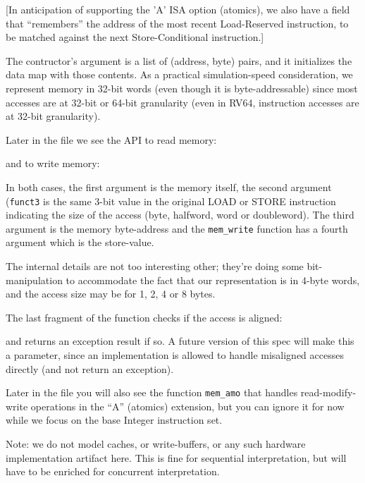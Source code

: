 \documentclass[11pt]{article}
\begin{document}
[In anticipation of supporting the 'A' ISA option (atomics), we also
have a field that ``remembers'' the address of the most recent
Load-Reserved instruction, to be matched against the next
Store-Conditional instruction.]

The contructor's argument is a list of (address, byte) pairs, and it
initializes the data map with those contents.  As a practical
simulation-speed consideration, we represent memory in 32-bit words
(even though it is byte-addressable) since most accesses are at 32-bit
or 64-bit granularity (even in RV64, instruction accesses are at
32-bit granularity).

Later in the file we see the API to read memory:



and to write memory:



In both cases, the first argument is the memory itself, the second
argument (\verb|funct3| is the same 3-bit value in the original LOAD
or STORE instruction indicating the size of the access (byte,
halfword, word or doubleword).  The third argument is the memory
byte-address and the \verb|mem_write| function has a fourth argument
which is the store-value.

The internal details are not too interesting other; they're doing some
bit-manipulation to accommodate the fact that our representation is in
4-byte words, and the access size may be for 1, 2, 4 or 8 bytes.

The last fragment of the function checks if the access is aligned:



and returns an exception result if so.  A future version of this spec
will make this a parameter, since an implementation is allowed to
handle misaligned accesses directly (and not return an exception).

Later in the file you will also see the function \verb|mem_amo| that
handles read-modify-write operations in the ``A'' (atomics) extension,
but you can ignore it for now while we focus on the base Integer
instruction set.

Note: we do not model caches, or write-buffers, or any such hardware
implementation artifact here.  This is fine for sequential
interpretation, but will have to be enriched for concurrent
interpretation.

\end{document}
